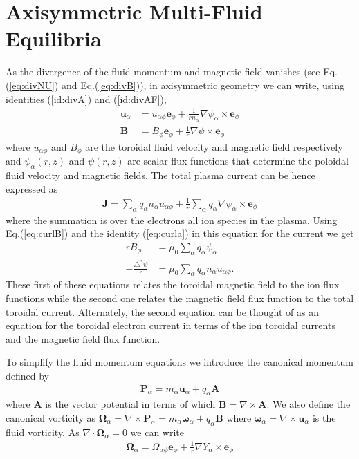 \documentclass[11pt, reqno]{amsart}
\newcommand{\eqr}[1]{Eq.\thinspace(#1)}
\newcommand{\mvec}[1]{\mathbf{#1}}
\newcommand{\gvec}[1]{\boldsymbol{#1}}
\newcommand{\eep}{\mvec{e}_\phi}
\theoremstyle{definition}
\begin{document}
\section{Axisymmetric Multi-Fluid Equilibria}

As the divergence of the fluid momentum and magnetic field vanishes
(see \eqr{\ref{eq:divNU}} and \eqr{\ref{eq:divB}}), in axisymmetric
geometry we can write, using identities (\ref{id:divA}) and
(\ref{id:divAF}),
\begin{align}
  \mvec{u}_\alpha &= u_{\alpha \phi} \eep +
  \frac{1}{r n_\alpha}\nabla\psi_\alpha \times \eep \label{eq:uform} \\
  \mvec{B} &= B_{\phi} \eep +
  \frac{1}{r}\nabla\psi \times \eep \label{eq:bform}
\end{align}
where $u_{\alpha \phi}$ and $B_{\phi}$ are the toroidal fluid velocity
and magnetic field respectively and $\psi_\alpha(r,z)$ and $\psi(r,z)$
are scalar flux functions that determine the poloidal fluid velocity
and magnetic fields. The total plasma current can be hence expressed
as
\begin{align}
  \mvec{J} = \sum_\alpha q_\alpha n_\alpha u_{\alpha \phi}
  + \frac{1}{r}\sum_\alpha q_\alpha \nabla \psi_\alpha \times \eep
\end{align}
where the summation is over the electrons all ion species in the
plasma. Using \eqr{\ref{eq:curlB}} and the identity (\ref{eq:curla})
in this equation for the current we get
\begin{align}
  rB_\phi &= \mu_0\sum_\alpha q_\alpha \psi_\alpha \\
  -\frac{\triangle^*\psi}{r} &=
  \mu_0 \sum_\alpha q_\alpha n_\alpha u_{\alpha \phi}.
\end{align}
These first of these equations relates the toroidal magnetic field to
the ion flux functions while the second one relates the magnetic field
flux function to the total toroidal current. Alternately, the second
equation can be thought of as an equation for the toroidal electron
current in terms of the ion toroidal currents and the magnetic field
flux function.

To simplify the fluid momentum equations we introduce the canonical
momentum defined by
\begin{align}
  \mvec{P}_\alpha = m_\alpha\mvec{u}_\alpha + q_\alpha \mvec{A}
\end{align}
where $\mvec{A}$ is the vector potential in terms of which $\mvec{B} =
\nabla\times \mvec{A}$. We also define the canonical vorticity as
$\mvec{\Omega}_\alpha = \nabla\times \mvec{P}_\alpha =
m_\alpha\gvec{\omega}_\alpha + q_\alpha \mvec{B}$ where
$\gvec{\omega}_\alpha=\nabla\times \mvec{u}_\alpha$ is the fluid
vorticity. As $\nabla\cdot\mvec{\Omega}_\alpha = 0$ we can write
\begin{align}
  \mvec{\Omega}_\alpha = \Omega_{\alpha \phi} \eep + \frac{1}{r}\nabla
  Y_{\alpha}\times \eep
\end{align}
\end{document}
